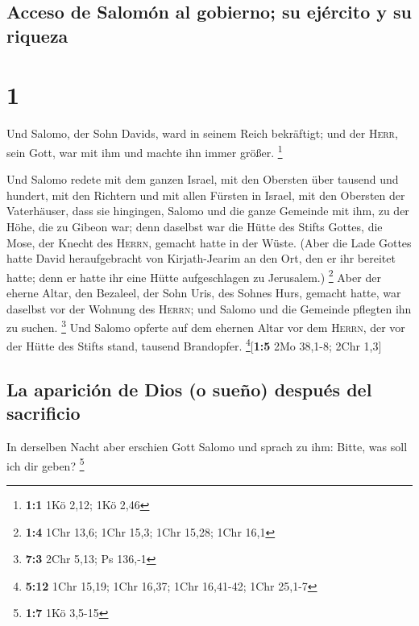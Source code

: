 \hypertarget{acceso-de-salomuxf3n-al-gobierno-su-ejuxe9rcito-y-su-riqueza}{%
\subsection{Acceso de Salomón al gobierno; su ejército y su
riqueza}\label{acceso-de-salomuxf3n-al-gobierno-su-ejuxe9rcito-y-su-riqueza}}

\hypertarget{section}{%
\section{1}\label{section}}

 Und Salomo, der Sohn Davids, ward in seinem Reich
bekräftigt; und der \textsc{Herr}, sein Gott, war mit ihm und machte ihn
immer größer. \footnote{\textbf{1:1} 1Kö 2,12; 1Kö 2,46}

 Und Salomo redete mit dem ganzen Israel, mit den Obersten
über tausend und hundert, mit den Richtern und mit allen Fürsten in
Israel, mit den Obersten der Vaterhäuser,  dass sie
hingingen, Salomo und die ganze Gemeinde mit ihm, zu der Höhe, die zu
Gibeon war; denn daselbst war die Hütte des Stifts Gottes, die Mose, der
Knecht des \textsc{Herrn}, gemacht hatte in der Wüste. 
(Aber die Lade Gottes hatte David heraufgebracht von Kirjath-Jearim an
den Ort, den er ihr bereitet hatte; denn er hatte ihr eine Hütte
aufgeschlagen zu Jerusalem.) \footnote{\textbf{1:4} 1Chr 13,6; 1Chr
  15,3; 1Chr 15,28; 1Chr 16,1}  Aber der eherne Altar, den
Bezaleel, der Sohn Uris, des Sohnes Hurs, gemacht hatte, war daselbst
vor der Wohnung des \textsc{Herrn}; und Salomo und die Gemeinde pflegten
ihn zu suchen. \footnote{\textbf{7:3} 2Chr 5,13; Ps 136,-1}
 Und Salomo opferte auf dem ehernen Altar vor dem
\textsc{Herrn}, der vor der Hütte des Stifts stand, tausend Brandopfer.
\footnote{\textbf{5:12} 1Chr 15,19; 1Chr 16,37; 1Chr 16,41-42; 1Chr
  25,1-7}{[}\textbf{1:5} 2Mo 38,1-8; 2Chr 1,3{]}

\hypertarget{la-apariciuxf3n-de-dios-o-sueuxf1o-despuuxe9s-del-sacrificio}{%
\subsection{La aparición de Dios (o sueño) después del
sacrificio}\label{la-apariciuxf3n-de-dios-o-sueuxf1o-despuuxe9s-del-sacrificio}}

 In derselben Nacht aber erschien Gott Salomo und sprach
zu ihm: Bitte, was soll ich dir geben? \footnote{\textbf{1:7} 1Kö 3,5-15}

